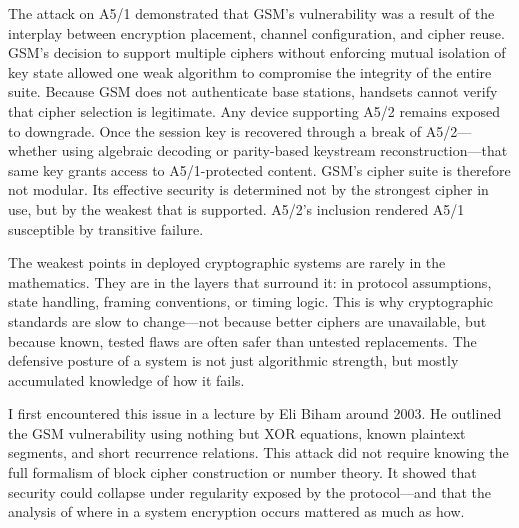 The attack on A5/1 demonstrated that GSM’s vulnerability was a result of the interplay between encryption placement, channel configuration, and cipher reuse. GSM’s decision to support multiple ciphers without enforcing mutual isolation of key state allowed one weak algorithm to compromise the integrity of the entire suite. Because GSM does not authenticate base stations, handsets cannot verify that cipher selection is legitimate. Any device supporting A5/2 remains exposed to downgrade. Once the session key is recovered through a break of A5/2—whether using algebraic decoding or parity-based keystream reconstruction—that same key grants access to A5/1-protected content. GSM’s cipher suite is therefore not modular. Its effective security is determined not by the strongest cipher in use, but by the weakest that is supported. A5/2’s inclusion rendered A5/1 susceptible by transitive failure.
\newpage
\begin{commentary}

The weakest points in deployed cryptographic systems are rarely in the mathematics. They are in the layers that surround it: in protocol assumptions, state handling, framing conventions, or timing logic. This is why cryptographic standards are slow to change—not because better ciphers are unavailable, but because known, tested flaws are often safer than untested replacements. The defensive posture of a system is not just algorithmic strength, but mostly accumulated knowledge of how it fails.

I first encountered this issue in a lecture by Eli Biham around 2003. He outlined the GSM vulnerability using nothing but XOR equations, known plaintext segments, and short recurrence relations. This attack did not require knowing the full formalism of block cipher construction or number theory. It showed that security could collapse under regularity exposed by the protocol—and that the analysis of \QENOpen{}where\QENClose{} in a system encryption occurs mattered as much as \QENOpen{}how.\QENClose{}

\end{commentary}

